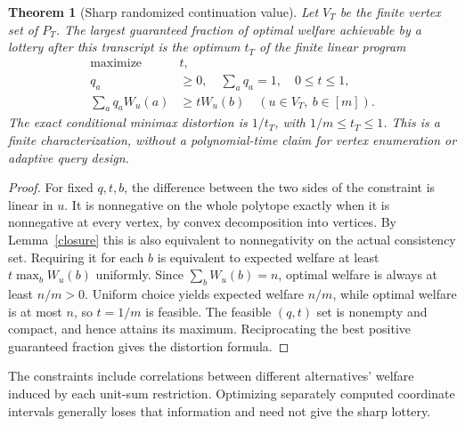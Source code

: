 \documentclass[11pt]{article}
\newtheorem{theorem}{Theorem}
\theoremstyle{remark}
\begin{document}
\begin{theorem}[Sharp randomized continuation value]
Let $V_T$ be the finite vertex set of $P_T$. The largest guaranteed
fraction of optimal welfare achievable by a lottery after this
transcript is the optimum $t_T$ of the finite linear program
\[
 \begin{split}
 \text{maximize }&t,\\
 q_a&\geq0,\quad\sum_aq_a=1,\quad0\leq t\leq1,\\
 \sum_aq_aW_u(a)&\geq tW_u(b)
       \quad(u\in V_T,\ b\in[m]).
 \end{split}
\]
The exact conditional minimax distortion is $1/t_T$, with
$1/m\leq t_T\leq1$. This is a finite characterization, without a
polynomial-time claim for vertex enumeration or adaptive query design.
\end{theorem}
\begin{proof}
For fixed $q,t,b$, the difference between the two sides of the constraint
is linear in $u$. It is nonnegative on the whole polytope exactly when
it is nonnegative at every vertex, by convex decomposition into vertices.
By Lemma~\ref{closure} this is also equivalent to nonnegativity on the
actual consistency set. Requiring it for each $b$ is equivalent to
expected welfare at least $t\max_bW_u(b)$ uniformly. Since
$\sum_bW_u(b)=n$, optimal welfare is always at least $n/m>0$.
Uniform choice yields expected welfare $n/m$, while optimal welfare
is at most $n$, so $t=1/m$ is feasible. The feasible $(q,t)$ set is
nonempty and compact, and hence attains its maximum. Reciprocating the
best positive guaranteed fraction gives the distortion formula.
\end{proof}

The constraints include correlations between different alternatives'
welfare induced by each unit-sum restriction. Optimizing separately
computed coordinate intervals generally loses that information and
need not give the sharp lottery.
\end{document}
